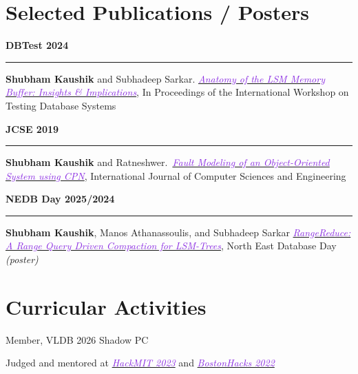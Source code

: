 \documentclass[11pt,a4paper,calibri]{moderncv}
\newcommand{\publication}[2]{
\noindent
  \begin{minipage}[c]{0.12\textwidth} \centering \textbf{#1} \end{minipage}%
  \hspace{0.005\textwidth}
  \begin{minipage}[c]{0.02\textwidth} \textcolor{lightgray}{\rule{1pt}{0.75cm}} \end{minipage}%
  \begin{minipage}[c]{0.85\textwidth} \raggedright{#2} \end{minipage}%
}
\begin{document}
% 

\vspace{-0.7em}
\section{Selected Publications / Posters}
\publication{DBTest 2024}{\textbf{Shubham Kaushik} and Subhadeep Sarkar. \href{https://doi.org/10.1145/3662165.3662766}{\textit{\textcolor{blueviolet}{Anatomy
        of the LSM Memory Buffer: Insights \& Implications}}}, In Proceedings of the International Workshop on Testing Database Systems}

\mediumspace{}

\publication{JCSE 2019}{\textbf{Shubham Kaushik} and Ratneshwer.\ \href{https://doi.org/10.26438/ijcse/v7i5.18281845}{\textit{\textcolor{blueviolet}{Fault
        Modeling of an Object-Oriented System using CPN}}}, International Journal of Computer Sciences and Engineering}

\mediumspace{}

\publication{NEDB Day 2025/2024}{\textbf{Shubham Kaushik}, Manos Athanassoulis, and Subhadeep Sarkar
  \href{https://bu-disc.github.io/nedbday/2024/download/posters/RangeReduce_A_Range_Query_Driven_Compaction_for_LSM-Trees.pdf}
  {\textit{\textcolor{blueviolet}{RangeReduce: A Range Query Driven Compaction for LSM-Trees}}}, North East Database Day \hfill \textit{(poster)}}


\vspace{-0.5em}
\section{Curricular Activities}
\begin{itemize*}[itemjoin=\hspace{6em}]
  \item Member, VLDB 2026 Shadow PC
  \item Judged and mentored at \href{https://hackmit.org/}{\textcolor{blueviolet}{\textit{HackMIT 2023}}} and \href{https://bostonhacks.io/}
	{\textit{\textcolor{blueviolet}{BostonHacks 2022}}}
\end{itemize*}


\mediumspace{}






\end{document}
